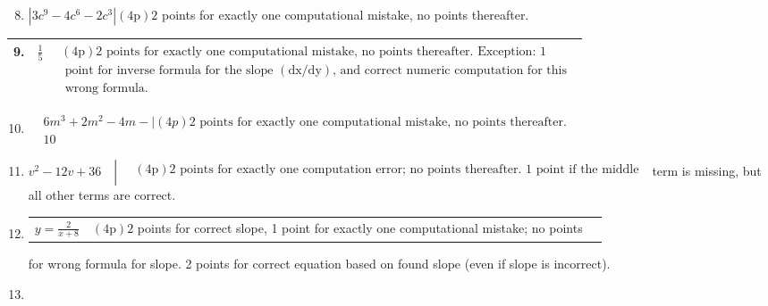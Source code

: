 \documentclass{ximera}
\begin{document}
\begin{enumerate}
  \setcounter{enumi}{7}
  \item $\left|3 c^{9}-4 c^{6}-2 c^{3}\right|(4 \mathrm{p}) 2$ points for exactly one computational mistake, no points thereafter.
\end{enumerate}

\begin{center}
\begin{tabular}{l|l|l|}
9. & $\frac{1}{5}$ & $\begin{array}{l}(4 \mathrm{p}) 2 \text { points for exactly one computational mistake, no points thereafter. Exception: } 1 \\ \text { point for inverse formula for the slope }(\mathrm{dx} / \mathrm{dy}) \text {, and correct numeric computation for this } \\ \text { wrong formula. }\end{array}$ \\
\hline
\end{tabular}
\end{center}

\begin{enumerate}
  \setcounter{enumi}{9}
  \item $\begin{aligned} & 6 m^{3}+2 m^{2}-4 m-\mid(4 p) 2 \text { points for exactly one computational mistake, no points thereafter. } \\ & 10\end{aligned}$
  \item $v^{2}-12 v+36 \quad \left\lvert\, \begin{aligned} & (4 \mathrm{p}) 2 \text { points for exactly one computation error; no points thereafter. } 1 \text { point if the middle } \\ & \end{aligned}\right.$ term is missing, but all other terms are correct.
  \item \begin{center}
\begin{tabular}{ll|l}
$y=\frac{2}{x+8}$ & $(4 \mathrm{p}) 2$ points for correct slope, 1 point for exactly one computational mistake; no points \\
\end{tabular}
\end{center} for wrong formula for slope. 2 points for correct equation based on found slope (even if slope is incorrect).

  \item 
\end{enumerate}
\end{document}
